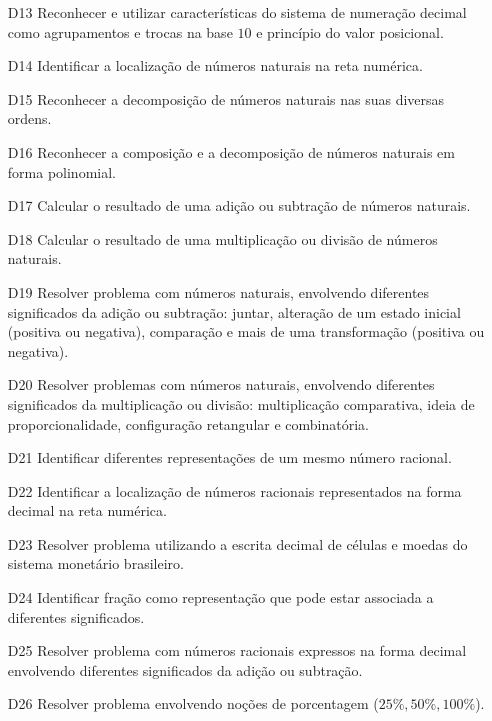     \begin{enumerate}
        \item[D13] \label{itm5:D13} Reconhecer e utilizar características do sistema de numeração decimal como agrupamentos e trocas na base $10$ e princípio do valor posicional.
        \item[D14] \label{itm5:D14} Identificar a localização de números naturais na reta numérica.
        \item[D15] \label{itm5:D15} Reconhecer a decomposição de números naturais nas suas diversas ordens.
        \item[D16] \label{itm5:D16} Reconhecer a composição e a decomposição de números naturais em forma polinomial.
        \item[D17] \label{itm5:D17} Calcular o resultado de uma adição ou subtração de números naturais.
        \item[D18] \label{itm5:D18} Calcular o resultado de uma multiplicação ou divisão de números naturais.
        \item[D19] \label{itm5:D19} Resolver problema com números naturais, envolvendo diferentes significados da adição ou subtração: juntar, alteração de um estado inicial (positiva ou negativa), comparação e mais de uma transformação (positiva ou negativa).
        \item[D20] \label{itm5:D20} Resolver problemas com números naturais, envolvendo diferentes significados da multiplicação ou divisão: multiplicação comparativa, ideia de proporcionalidade, configuração retangular e combinatória.
        \item[D21] \label{itm5:D21} Identificar diferentes representações de um mesmo número racional.
        \item[D22] \label{itm5:D22} Identificar a localização de números racionais representados na forma decimal na reta numérica.
        \item[D23] \label{itm5:D23} Resolver problema utilizando a escrita decimal de células e moedas do sistema monetário brasileiro.
        \item[D24] \label{itm5:D24} Identificar fração como representação que pode estar associada a diferentes significados.
        \item[D25] \label{itm5:D25} Resolver problema com números racionais expressos na forma decimal envolvendo diferentes significados da adição ou subtração.
        \item[D26] \label{itm5:D26} Resolver problema envolvendo noções de porcentagem ($25\%, 50\%,100\%$).
     \end{enumerate}
